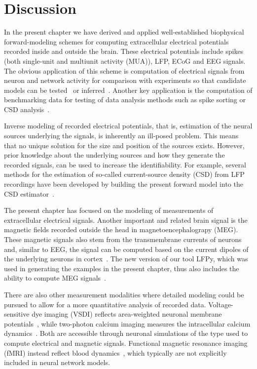 \documentclass[preprint,11pt,authoryear]{elsarticle}
\begin{document}
\section{Discussion}
\label{sec:summary}

In the present chapter we have derived and applied well-established biophysical forward-modeling schemes for computing extracellular electrical potentials recorded inside and outside the brain. These electrical potentials include spikes (both single-unit and multiunit activity (MUA)), LFP, ECoG and EEG signals. The obvious application of this scheme is computation of electrical signals from neuron and network activity for comparison with experiments so that candidate models can be tested~\citep{Einevoll2019} or inferred~\citep{Goncalves2019,Skaar2020}.
Another key application is the computation of benchmarking data for testing of data analysis methods such as 
spike sorting or CSD analysis~\citep{Denker2012}. 

Inverse modeling of recorded electrical potentials, that is, estimation of the neural sources underlying the signals, is inherently an ill-posed problem. This means that no unique solution for the size and position of the sources exists. However, prior knowledge about the underlying sources and how they generate the recorded signals, can be used to increase the identifiability. For example, several methods for the estimation of so-called current-source density (CSD) from LFP recordings have been developed by building the present forward model into the CSD 
estimator~\citep{Pettersen2006,Potworowski2012,Cserpan2017}.

The present chapter has focused on the modeling of measurements of extracellular electrical signals. Another important and related brain signal
is the magnetic fields recorded outside the head in magnetoencephalograpy (MEG). These magnetic signals also stem from the transmembrane currents of neurons and, similar to EEG, the signal can be computed based on the current dipoles of the underlying neurons in 
cortex~\citep{Hamalainen1993,Ilmoniemi2019}. The new version of our tool LFPy, which was used in generating the examples in the present chapter, thus also includes the ability to compute MEG signals~\citep{Hagen2018}. 

There are also other measurement modalities where detailed modeling could be pursued to allow for a more quantitative analysis of recorded data. Voltage-sensitive dye imaging (VSDI) reflects area-weighted neuronal membrane potentials~\citep{Chemla2012}, while two-photon calcium imaging measures the intracellular calcium dynamics~\citep{Helmchen2012}. Both are accessible through neuronal simulations of the type used to compute electrical and magnetic signals. Functional magnetic resonance imaging (fMRI) instead reflect blood dynamics~\citep{Bartels2012}, 
which typically are not explicitly included in neural network models.
\end{document}

